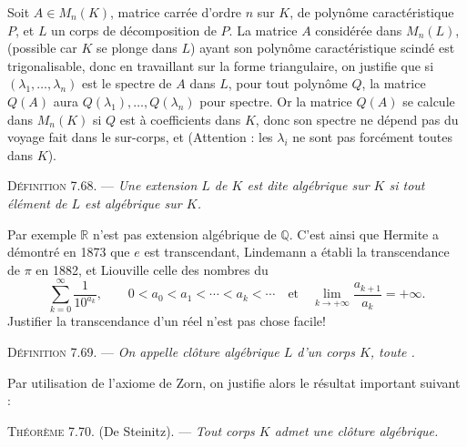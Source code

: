 Soit $A\in M_n(K)$, matrice carrée d'ordre $n$ sur $K$, de polynôme caractéristique $P$, et $L$ un corps de décomposition de $P$. La matrice $A$ considérée dans $M_n(L)$, (possible car $K$ se plonge dans $L$) ayant son polynôme caractéristique scindé est trigonalisable, donc en travaillant sur la forme triangulaire, on justifie que si $(\lambda_1,\ldots,\lambda_n)$ est le spectre de $A$ dans $L$, pour tout polynôme $Q$, la matrice $Q(A)$ aura $Q(\lambda_1),\ldots,Q(\lambda_n)$ pour spectre. Or la matrice $Q(A)$ se calcule dans $M_n(K)$ si $Q$ est à coefficients dans $K$, donc son spectre ne dépend pas du voyage fait dans le sur-corps, et  (Attention : les $\lambda_i$ ne sont pas forcément toutes dans $K$).

\medskip\noindent\textsc{Définition 7.68.} --- \emph{Une extension $L$ de $K$ est dite algébrique sur $K$ si tout élément de $L$ est algébrique sur $K$.}

Par exemple $\mathbb R$ n'est pas extension algébrique de $\mathbb Q$. C'est ainsi que Hermite a démontré en 1873 que $e$ est transcendant, Lindemann a établi la transcendance de $\pi$ en 1882, et Liouville celle des nombres du 
\[
\sum_{k=0}^{\infty}\frac1{10^{a_k}},\qquad
0<a_0<a_1<\cdots<a_k<\cdots\quad\text{et}\quad
\lim_{k\to+\infty}\frac{a_{k+1}}{a_k}=+\infty.
\]
Justifier la transcendance d'un réel n'est pas chose facile!

\medskip\noindent\textsc{Définition 7.69.} --- \emph{On appelle clôture algébrique $L$ d'un corps $K$, toute .}

Par utilisation de l'axiome de Zorn, on justifie alors le résultat important suivant :

\medskip\noindent\textsc{Théorème 7.70.} (De Steinitz). --- \emph{Tout corps $K$ admet une clôture algébrique.}

